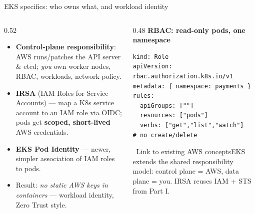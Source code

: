 \documentclass[aspectratio=169,10pt]{beamer}
\newcommand{\term}[1]{{\color{awsink}\textbf{#1}}}
\newcommand{\bridge}[1]{%
  \begin{block}{\small\ding{43}\ Link to existing AWS concepts}\small #1\end{block}}
\begin{document}
\begin{frame}[fragile]{EKS specifics: who owns what, and workload identity}
  \begin{columns}[T]
    \begin{column}{0.52\textwidth}\small
      \begin{itemize}
        \item \term{Control-plane responsibility}: AWS runs/patches the API server \& etcd;
              \emph{you} own worker nodes, RBAC, workloads, network policy.
        \item \term{IRSA} (IAM Roles for Service Accounts) --- map a K8s service account to an IAM role
              via OIDC; pods get \term{scoped, short-lived} AWS credentials.
        \item \term{EKS Pod Identity} --- newer, simpler association of IAM roles to pods.
        \item Result: \emph{no static AWS keys in containers} --- workload identity, Zero Trust style.
      \end{itemize}
    \end{column}
    \begin{column}{0.48\textwidth}
      \scriptsize\textbf{RBAC: read-only pods, one namespace}
      \begin{lstlisting}
kind: Role
apiVersion: rbac.authorization.k8s.io/v1
metadata: { namespace: payments }
rules:
- apiGroups: [""]
  resources: ["pods"]
  verbs: ["get","list","watch"]   # no create/delete
      \end{lstlisting}
      \bridge{\scriptsize EKS extends the shared responsibility model: control plane = AWS,
      data plane = you. IRSA reuses IAM + STS from Part I.}
    \end{column}
  \end{columns}
\end{frame}
\end{document}
